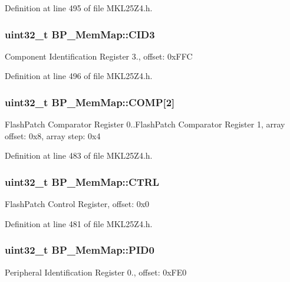 Definition at line 495 of file M\+K\+L25\+Z4.\+h.

\subsubsection[{\texorpdfstring{C\+I\+D3}{CID3}}]{\setlength{\rightskip}{0pt plus 5cm}uint32\+\_\+t B\+P\+\_\+\+Mem\+Map\+::\+C\+I\+D3}\hypertarget{struct_b_p___mem_map_a26076f956d1700acaeb0c9db60846606}{}\label{struct_b_p___mem_map_a26076f956d1700acaeb0c9db60846606}
Component Identification Register 3., offset\+: 0x\+F\+FC 

Definition at line 496 of file M\+K\+L25\+Z4.\+h.

\subsubsection[{\texorpdfstring{C\+O\+MP}{COMP}}]{\setlength{\rightskip}{0pt plus 5cm}uint32\+\_\+t B\+P\+\_\+\+Mem\+Map\+::\+C\+O\+MP\mbox{[}2\mbox{]}}\hypertarget{struct_b_p___mem_map_ac8c266a109ad2f29683dfb7873b71974}{}\label{struct_b_p___mem_map_ac8c266a109ad2f29683dfb7873b71974}
Flash\+Patch Comparator Register 0..Flash\+Patch Comparator Register 1, array offset\+: 0x8, array step\+: 0x4 

Definition at line 483 of file M\+K\+L25\+Z4.\+h.

\subsubsection[{\texorpdfstring{C\+T\+RL}{CTRL}}]{\setlength{\rightskip}{0pt plus 5cm}uint32\+\_\+t B\+P\+\_\+\+Mem\+Map\+::\+C\+T\+RL}\hypertarget{struct_b_p___mem_map_adc78a44bcbb6564277efefa8f07439ce}{}\label{struct_b_p___mem_map_adc78a44bcbb6564277efefa8f07439ce}
Flash\+Patch Control Register, offset\+: 0x0 

Definition at line 481 of file M\+K\+L25\+Z4.\+h.

\subsubsection[{\texorpdfstring{P\+I\+D0}{PID0}}]{\setlength{\rightskip}{0pt plus 5cm}uint32\+\_\+t B\+P\+\_\+\+Mem\+Map\+::\+P\+I\+D0}\hypertarget{struct_b_p___mem_map_acb1de7fb15f421c81ddfbf6feba0c4f2}{}\label{struct_b_p___mem_map_acb1de7fb15f421c81ddfbf6feba0c4f2}
Peripheral Identification Register 0., offset\+: 0x\+F\+E0 


